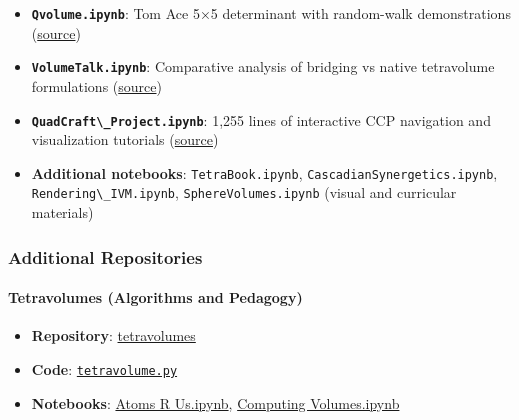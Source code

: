 \documentclass[
  10pt,
]{article}
\newcommand{\passthrough}[1]{#1}
\providecommand{\tightlist}{%
  \setlength{\itemsep}{0pt}\setlength{\parskip}{0pt}}
\begin{document}
\begin{itemize}
\tightlist
\item
  \textbf{\passthrough{\lstinline!Qvolume.ipynb!}}: Tom Ace 5×5
  determinant with random-walk demonstrations
  (\href{https://github.com/4dsolutions/School_of_Tomorrow/blob/master/Qvolume.ipynb}{source})
\item
  \textbf{\passthrough{\lstinline!VolumeTalk.ipynb!}}: Comparative
  analysis of bridging vs native tetravolume formulations
  (\href{https://github.com/4dsolutions/School_of_Tomorrow/blob/master/VolumeTalk.ipynb}{source})
\item
  \textbf{\passthrough{\lstinline!QuadCraft\_Project.ipynb!}}: 1,255
  lines of interactive CCP navigation and visualization tutorials
  (\href{https://github.com/4dsolutions/School_of_Tomorrow/blob/master/QuadCraft_Project.ipynb}{source})
\item
  \textbf{Additional notebooks}:
  \passthrough{\lstinline!TetraBook.ipynb!},
  \passthrough{\lstinline!CascadianSynergetics.ipynb!},
  \passthrough{\lstinline!Rendering\_IVM.ipynb!},
  \passthrough{\lstinline!SphereVolumes.ipynb!} (visual and curricular
  materials)
\end{itemize}

\hypertarget{additional-repositories}{%
\subsubsection{Additional Repositories}\label{additional-repositories}}

\hypertarget{tetravolumes-algorithms-and-pedagogy}{%
\paragraph{Tetravolumes (Algorithms and
Pedagogy)}\label{tetravolumes-algorithms-and-pedagogy}}

\begin{itemize}
\tightlist
\item
  \textbf{Repository}:
  \href{https://github.com/4dsolutions/tetravolumes}{tetravolumes}
\item
  \textbf{Code}:
  \href{https://github.com/4dsolutions/tetravolumes/blob/master/tetravolume.py}{\passthrough{\lstinline!tetravolume.py!}}
\item
  \textbf{Notebooks}:
  \href{https://raw.githubusercontent.com/4dsolutions/tetravolumes/refs/heads/master/Atoms\%20R\%20Us.ipynb}{Atoms
  R Us.ipynb},
  \href{https://raw.githubusercontent.com/4dsolutions/tetravolumes/refs/heads/master/Computing\%20Volumes.ipynb}{Computing
  Volumes.ipynb}
\end{itemize}
\end{document}
